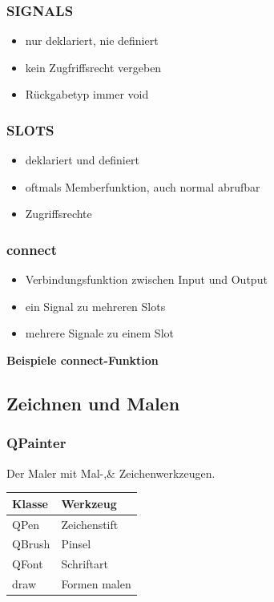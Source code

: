 \begin{multicols}{3}
\subsubsection{SIGNALS}
\begin{itemize}
	\item nur deklariert, nie definiert
	\item kein Zugfriffsrecht vergeben
	\item Rückgabetyp immer void
\end{itemize}

\subsubsection{SLOTS}
\begin{itemize}
	\item deklariert und definiert
	\item oftmals Memberfunktion, auch normal abrufbar
	\item Zugriffsrechte
\end{itemize}

\subsubsection{connect}
\begin{itemize}
	\item Verbindungsfunktion zwischen Input und Output
	\item ein Signal zu mehreren Slots
	\item mehrere Signale zu einem Slot
\end{itemize}
\end{multicols}

\vspace{0.5pt}
\textbf{Beispiele connect-Funktion}


\subsection{Zeichnen und Malen}
\subsubsection{QPainter}
Der Maler mit Mal-,\& Zeichenwerkzeugen.\\

\begin{tabular}{|l|l|}
	\hline \textbf{Klasse} & \textbf{Werkzeug}\\
	\hline QPen & Zeichenstift\\
	\hline QBrush & Pinsel\\
	\hline QFont & Schriftart\\
	\hline draw & Formen malen\\
	\hline
\end{tabular}

